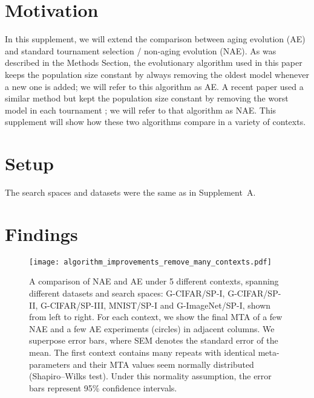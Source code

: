\documentclass[letterpaper]{article} \usepackage{aaai19}  \usepackage{times}  \usepackage{helvet}  \usepackage{courier}  \usepackage{graphicx}  \frenchspacing
\begin{document}
\FloatBarrier
\clearpage
\renewcommand{\thesection}{B-\arabic{section}}
\renewcommand{\thefigure}{B-\arabic{figure}}
\setcounter{section}{0}
\setcounter{figure}{0}
\setcounter{table}{0}


\section{Motivation}


In this supplement, we will extend the comparison between aging evolution (AE) and standard tournament selection / non-aging evolution (NAE). As was described in the Methods Section, the evolutionary algorithm used in this paper keeps the population size constant by always removing the oldest model whenever a new one is added; we will refer to this algorithm as AE. A recent paper used a similar method but kept the population size constant by removing the worst model in each tournament \cite{real2017large}; we will refer to that algorithm as NAE. This supplement will show how these two algorithms compare in a variety of contexts.


\section{Setup}


The search spaces and datasets were the same as in Supplement~A.


\section{Findings}


\begin{figure}[ht]
\centering
\texttt{[image: algorithm\_improvements\_remove\_many\_contexts.pdf]}
\caption{
A comparison of NAE and AE under 5 different contexts, spanning different datasets and search spaces: G-CIFAR/SP-I, G-CIFAR/SP-II, G-CIFAR/SP-III, MNIST/SP-I and G-ImageNet/SP-I, shown from left to right. For each context, we show the final MTA of a few NAE and a few AE experiments (circles) in adjacent columns. We superpose  error bars, where SEM denotes the standard error of the mean. The first context contains many repeats with identical meta-parameters and their MTA values seem normally distributed (Shapiro--Wilks test). Under this normality assumption, the error bars represent 95\% confidence intervals.
}
\label{regularizing_contexts_subfig}
\end{figure}
\end{document}

